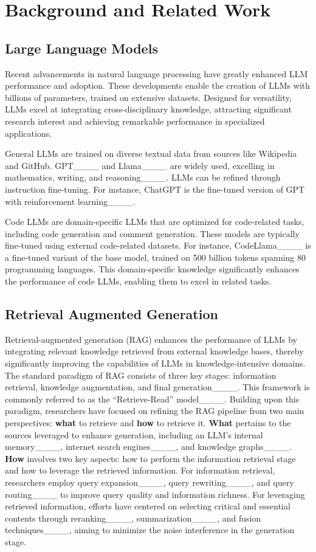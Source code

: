 \section{Background and Related Work}
\label{sec:bg}
\subsection{Large Language Models}
Recent advancements in natural language processing have greatly enhanced LLM performance and adoption. These developments enable the creation of LLMs with billions of parameters, trained on extensive datasets. Designed for versatility, LLMs excel at integrating cross-disciplinary knowledge, attracting significant research interest and achieving remarkable performance in specialized applications.

General LLMs are trained on diverse textual data from sources like Wikipedia and GitHub. GPT____ and Llama____ are widely used, excelling in mathematics, writing, and reasoning____. LLMs can be refined through instruction fine-tuning. For instance, ChatGPT is the fine-tuned version of GPT with reinforcement learning____. 



Code LLMs are domain-specific LLMs that are optimized for code-related tasks, including code generation and comment generation. These models are typically fine-tuned using external code-related datasets. For instance, CodeLlama____ is a fine-tuned variant of the base model, trained on 500 billion tokens spanning 80 programming languages. This domain-specific knowledge significantly enhances the performance of code LLMs, enabling them to excel in related tasks. 

\subsection{Retrieval Augmented Generation}
Retrieval-augmented generation (RAG) enhances the performance of LLMs by integrating relevant knowledge retrieved from external knowledge bases, thereby significantly improving the capabilities of LLMs in knowledge-intensive domains. The standard paradigm of RAG consists of three key stages: information retrieval, knowledge augmentation, and final generation____. This framework is commonly referred to as the ``Retrieve-Read'' model____. 
Building upon this paradigm, researchers have focused on refining the RAG pipeline from two main perspectives: \textbf{what} to retrieve and \textbf{how} to retrieve it. \textbf{What} pertains to the sources leveraged to enhance generation, including an LLM's internal memory____, internet search engines____, and knowledge graphs____. \textbf{How} involves two key aspects: how to perform the information retrieval stage and how to leverage the retrieved information. For information retrieval, researchers employ query expansion____, query rewriting____, and query routing____ to improve query quality and information richness. For leveraging retrieved information, efforts have centered on selecting critical and essential contents through reranking____, summarization____, and fusion techniques____, aiming to minimize the noise interference in the generation stage.

